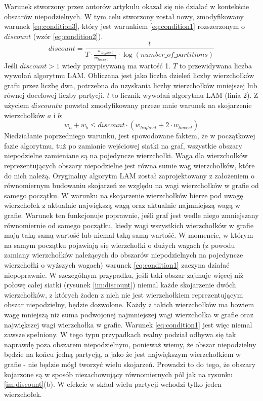 Warunek stworzony przez autorów artykułu \cite{weighted_maching} okazał się nie działać w kontekście obszarów
niepodzielnych.
W tym celu stworzony został nowy, zmodyfikowany warunek \ref{eq:condition3}, który jest warunkiem \ref{eq:condition1}
rozszerzonym o $discount$ (wzór \ref{eq:condition2}).
\begin{equation}
discount = \frac{t}{T \cdot \frac{w_{highest}}{w_{lowest} + 1} \cdot \log(number\_of\_partitions)}
\label{eq:condition2}
\end{equation}
Jeśli $discount > 1$ wtedy przypisywaną ma wartość 1.
$T$ to przewidywana liczba wywołań algorytmu LAM.
Obliczana jest jako liczba dzieleń liczby wierzchołków grafu przez liczbę dwa, potrzebna do uzyskania liczby wierzchołków mniejszej
lub równej docelowej liczby partycji.
$t$ to licznik wywołań algorytmu LAM (linia $2$).
Z użyciem $discountu$ powstał zmodyfikowany przeze mnie warunek na skojarzenie wierzchołków $a$ i $b$:
\begin{equation}
w_{a} + w_{b} \leq discount \cdot (w_{highest} + 2 \cdot w_{lowest})
\label{eq:condition3}
\end{equation}
Niedziałanie poprzedniego warunku, jest spowodowane faktem,
że w początkowej fazie algorytmu, tuż po zamianie wejściowej siatki na graf,
wszystkie obszary niepodzielne zamieniane są na pojedyncze wierzchołki.
Waga dla wierzchołków reprezentujących obszary niepodzielne jest równa sumie wag wierzchołków, które do nich należą.
Oryginalny algorytm LAM został zaprojektowany z założeniem o równomiernym budowaniu skojarzeń ze względu na wagi wierzchołków w grafie
od samego początku.
W warunku na skojarzenie wierzchołków bierze pod uwagę wierzchołek z aktualnie największą wagą
oraz aktualnie najmniejszą wagą w grafie.
Warunek ten funkcjonuje poprawnie, jeśli graf jest wedle niego zmniejszany równomiernie od samego początku, kiedy wagi wszystkich
wierzchołków w grafie mają taką samą wartość lub niemal taką samą wartość.
W momencie, w którym na samym początku pojawiają się wierzchołki o dużych wagach (z powodu zamiany wierzchołków
należących do obszarów niepodzielnych na pojedyncze wierzchołki o wyższych wagach) warunek \ref{eq:condition1} zaczyna
działać niepoprawnie.
W szczególnym przypadku, jeśli taki obszar zajmuje więcej niż połowę całej siatki
(rysunek \ref{im:discount}) niemal każde skojarzenie dwóch wierzchołków, z których żaden z nich nie jest wierzchołkiem
reprezentującym obszar niepodzielny, będzie dozwolone.
Każdy z takich wierzchołków ma bowiem wagę mniejszą niż suma podwojonej najmniejszej wagi wierzchołka w grafie oraz największej
wagi wierzchołka w grafie.
Warunek \ref{eq:condition1} jest więc niemal zawsze spełniony.
W tego typu przypadkach realny podział odbywa się tak naprawdę poza obszarem niepodzielnym, ponieważ wiemy, że obszar
niepodzielny będzie na końcu jedną partycją, a jako że jest największym wierzchołkiem w grafie - nie będzie mógł tworzyć
wielu skojarzeń.
Prowadzi to do tego, że obszary kojarzone są w sposób niezachowujący równomiernych pól jak na rysunku \ref{im:discount}(b).
W efekcie w skład wielu partycji wchodzi tylko jeden wierzchołek.


